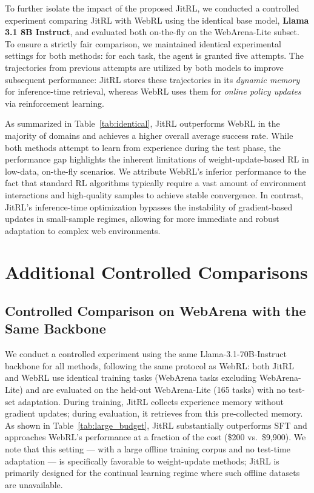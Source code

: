 

To further isolate the impact of the proposed JitRL, we conducted a controlled experiment comparing JitRL with WebRL using the identical base model, \textbf{Llama 3.1 8B Instruct}, and evaluated both on-the-fly on the WebArena-Lite subset. To ensure a strictly fair comparison, we maintained identical experimental settings for both methods: for each task, the agent is granted five attempts. The trajectories from previous attempts are utilized by both models to improve subsequent performance: JitRL stores these trajectories in its \textit{dynamic memory} for inference-time retrieval, whereas WebRL uses them for \textit{online policy updates} via reinforcement learning. 

As summarized in Table~\ref{tab:identical}, JitRL outperforms WebRL in the majority of domains and achieves a higher overall average success rate. While both methods attempt to learn from experience during the test phase, the performance gap highlights the inherent limitations of weight-update-based RL in low-data, on-the-fly scenarios. We attribute WebRL's inferior performance to the fact that standard RL algorithms typically require a vast amount of environment interactions and high-quality samples to achieve stable convergence. In contrast, JitRL's inference-time optimization bypasses the instability of gradient-based updates in small-sample regimes, allowing for more immediate and robust adaptation to complex web environments.

\section{Additional Controlled Comparisons}
\label{app:controlled_comparisons}


\subsection{Controlled Comparison on WebArena with the Same Backbone}
\label{app:large_budget}

We conduct a controlled experiment using the same Llama-3.1-70B-Instruct backbone for all methods, following the same protocol as WebRL: both JitRL and WebRL use identical training tasks (WebArena tasks excluding WebArena-Lite) and are evaluated on the held-out WebArena-Lite (165 tasks) with no test-set adaptation. During training, JitRL collects experience memory without gradient updates; during evaluation, it retrieves from this pre-collected memory. As shown in Table~\ref{tab:large_budget}, JitRL substantially outperforms SFT and approaches WebRL's performance at a fraction of the cost (\$200 vs.\ \$9,900). We note that this setting — with a large offline training corpus and no test-time adaptation — is specifically favorable to weight-update methods; JitRL is primarily designed for the continual learning regime where such offline datasets are unavailable.

